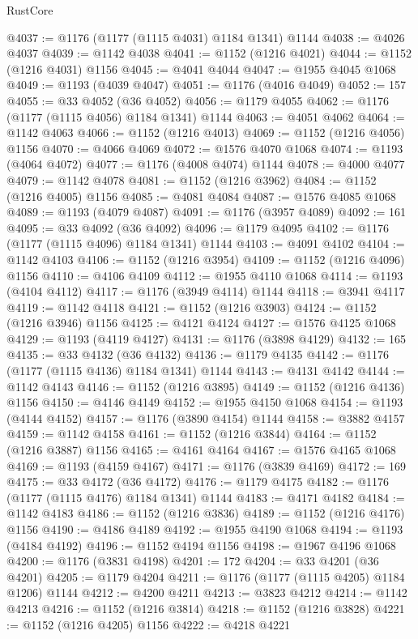 \begin{lexlean}{RustCore}
\begin{coremodule}
@4037 := @1176 (@1177 (@1115 @4031) @1184 @1341) @1144
@4038 := @4026 @4037
@4039 := @1142 @4038
@4041 := @1152 (@1216 @4021)
@4044 := @1152 (@1216 @4031) @1156
@4045 := @4041 @4044
@4047 := @1955 @4045 @1068
@4049 := @1193 (@4039 @4047)
@4051 := @1176 (@4016 @4049)
@4052 := 157
@4055 := @33 @4052 (@36 @4052)
@4056 := @1179 @4055
@4062 := @1176 (@1177 (@1115 @4056) @1184 @1341) @1144
@4063 := @4051 @4062
@4064 := @1142 @4063
@4066 := @1152 (@1216 @4013)
@4069 := @1152 (@1216 @4056) @1156
@4070 := @4066 @4069
@4072 := @1576 @4070 @1068
@4074 := @1193 (@4064 @4072)
@4077 := @1176 (@4008 @4074) @1144
@4078 := @4000 @4077
@4079 := @1142 @4078
@4081 := @1152 (@1216 @3962)
@4084 := @1152 (@1216 @4005) @1156
@4085 := @4081 @4084
@4087 := @1576 @4085 @1068
@4089 := @1193 (@4079 @4087)
@4091 := @1176 (@3957 @4089)
@4092 := 161
@4095 := @33 @4092 (@36 @4092)
@4096 := @1179 @4095
@4102 := @1176 (@1177 (@1115 @4096) @1184 @1341) @1144
@4103 := @4091 @4102
@4104 := @1142 @4103
@4106 := @1152 (@1216 @3954)
@4109 := @1152 (@1216 @4096) @1156
@4110 := @4106 @4109
@4112 := @1955 @4110 @1068
@4114 := @1193 (@4104 @4112)
@4117 := @1176 (@3949 @4114) @1144
@4118 := @3941 @4117
@4119 := @1142 @4118
@4121 := @1152 (@1216 @3903)
@4124 := @1152 (@1216 @3946) @1156
@4125 := @4121 @4124
@4127 := @1576 @4125 @1068
@4129 := @1193 (@4119 @4127)
@4131 := @1176 (@3898 @4129)
@4132 := 165
@4135 := @33 @4132 (@36 @4132)
@4136 := @1179 @4135
@4142 := @1176 (@1177 (@1115 @4136) @1184 @1341) @1144
@4143 := @4131 @4142
@4144 := @1142 @4143
@4146 := @1152 (@1216 @3895)
@4149 := @1152 (@1216 @4136) @1156
@4150 := @4146 @4149
@4152 := @1955 @4150 @1068
@4154 := @1193 (@4144 @4152)
@4157 := @1176 (@3890 @4154) @1144
@4158 := @3882 @4157
@4159 := @1142 @4158
@4161 := @1152 (@1216 @3844)
@4164 := @1152 (@1216 @3887) @1156
@4165 := @4161 @4164
@4167 := @1576 @4165 @1068
@4169 := @1193 (@4159 @4167)
@4171 := @1176 (@3839 @4169)
@4172 := 169
@4175 := @33 @4172 (@36 @4172)
@4176 := @1179 @4175
@4182 := @1176 (@1177 (@1115 @4176) @1184 @1341) @1144
@4183 := @4171 @4182
@4184 := @1142 @4183
@4186 := @1152 (@1216 @3836)
@4189 := @1152 (@1216 @4176) @1156
@4190 := @4186 @4189
@4192 := @1955 @4190 @1068
@4194 := @1193 (@4184 @4192)
@4196 := @1152 @4194 @1156
@4198 := @1967 @4196 @1068
@4200 := @1176 (@3831 @4198)
@4201 := 172
@4204 := @33 @4201 (@36 @4201)
@4205 := @1179 @4204
@4211 := @1176 (@1177 (@1115 @4205) @1184 @1206) @1144
@4212 := @4200 @4211
@4213 := @3823 @4212
@4214 := @1142 @4213
@4216 := @1152 (@1216 @3814)
@4218 := @1152 (@1216 @3828)
@4221 := @1152 (@1216 @4205) @1156
@4222 := @4218 @4221

\end{coremodule}
\end{lexlean}
